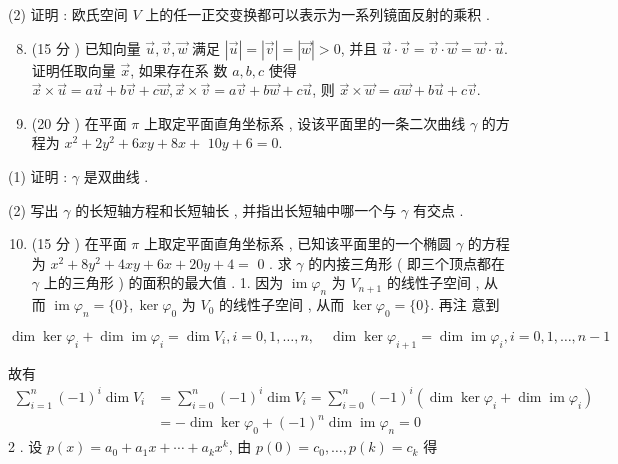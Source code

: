 \documentclass[10pt]{article}
\begin{document}
(2)  证明 :  欧氏空间  $V$  上的任一正交变换都可以表示为一系列镜面反射的乘积 .

\begin{enumerate}
  \setcounter{enumi}{7}
  \item (15  分 )  已知向量  $\vec{u}, \vec{v}, \vec{w}$  满足  $|\vec{u}|=|\vec{v}|=|\vec{w}|>0$,  并且  $\vec{u} \cdot \vec{v}=\vec{v} \cdot \vec{w}=\vec{w} \cdot \vec{u}$.  证明任取向量  $\vec{x}$,  如果存在系   数  $a, b, c$  使得  $\vec{x} \times \vec{u}=a \vec{u}+b \vec{v}+c \vec{w}, \vec{x} \times \vec{v}=a \vec{v}+b \vec{w}+c \vec{u}$,  则  $\vec{x} \times \vec{w}=a \vec{w}+b \vec{u}+c \vec{v}$.

  \item (20  分 )  在平面  $\pi$  上取定平面直角坐标系 ,  设该平面里的一条二次曲线  $\gamma$  的方程为  $x^{2}+2 y^{2}+6 x y+8 x+$ $10 y+6=0$.

\end{enumerate}
(1)  证明 : $\gamma$  是双曲线 .

(2)  写出  $\gamma$  的长短轴方程和长短轴长 ,  并指出长短轴中哪一个与  $\gamma$  有交点 .

\begin{enumerate}
  \setcounter{enumi}{9}
  \item (15  分 )  在平面  $\pi$  上取定平面直角坐标系 ,  已知该平面里的一个椭圆  $\gamma$  的方程为  $x^{2}+8 y^{2}+4 x y+6 x+20 y+4=$ 0 .  求  $\gamma$  的内接三角形  ( 即三个顶点都在  $\gamma$  上的三角形 )  的面积的最大值 . 1.  因为  $\operatorname{im} \varphi_{n}$  为  $V_{n+1}$  的线性子空间 ,  从而  $\operatorname{im} \varphi_{n}=\{0\}, \operatorname{ker} \varphi_{0}$  为  $V_{0}$  的线性子空间 ,  从而  $\operatorname{ker} \varphi_{0}=\{0\}$.  再注   意到 
\end{enumerate}
$\operatorname{dim} \operatorname{ker} \varphi_{i}+\operatorname{dim} \operatorname{im} \varphi_{i}=\operatorname{dim} V_{i}, i=0,1, \ldots, n, \quad \operatorname{dim} \operatorname{ker} \varphi_{i+1}=\operatorname{dim} \operatorname{im} \varphi_{i}, i=0,1, \ldots, n-1$

 故有 
$$
\begin{aligned}
\sum_{i=1}^{n}(-1)^{i} \operatorname{dim} V_{i} &=\sum_{i=0}^{n}(-1)^{i} \operatorname{dim} V_{i}=\sum_{i=0}^{n}(-1)^{i}\left(\operatorname{dim} \operatorname{ker} \varphi_{i}+\operatorname{dim} \operatorname{im} \varphi_{i}\right) \\
&=-\operatorname{dim} \operatorname{ker} \varphi_{0}+(-1)^{n} \operatorname{dim} \operatorname{im} \varphi_{n}=0
\end{aligned}
$$
2 .  设  $p(x)=a_{0}+a_{1} x+\cdots+a_{k} x^{k}$,  由  $p(0)=c_{0}, \ldots, p(k)=c_{k}$  得 
\end{document}
